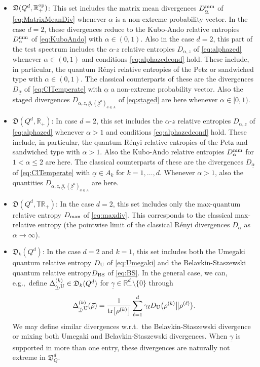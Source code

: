 \documentclass[12pt,a4paper,reqno]{amsart}
\theoremstyle{definition}
\newcommand{\mf}[1]{\mathfrak{#1}}
\newcommand{\R}{\mathbb R}
\newcommand{\T}{\mathbb T}
\newcommand{\tr}[1]{\mathrm{tr}\left[#1\right]} %
\let\originalleft\left
\let\originalright\right
\renewcommand{\left}{\mathopen{}\mathclose\bgroup\originalleft}
\renewcommand{\right}{\aftergroup\egroup\originalright}
\begin{document}
\begin{itemize}
\item $\mf D(Q^d,\R_+^{\rm op})$: This set includes the matrix mean divergences $D^{\rm mm}_{\underline{\alpha}}$ of \eqref{eq:MatrixMeanDiv} whenever $\underline{\alpha}$ is a non-extreme probability vector. In the case $d=2$, these divergences reduce to the Kubo-Ando relative entropies $D^{\rm mm}_\alpha$ of \eqref{eq:KuboAndo} with $\alpha\in(0,1)$. Also in the case $d=2$, this part of the test spectrum includes the $\alpha$-$z$ relative entropies $D_{\alpha,z}$ of \eqref{eq:alphazed} whenever $\alpha\in(0,1)$ and conditions \eqref{eq:alphazedcond} hold. These include, in particular, the quantum R\'{e}nyi relative entropies of the Petz or sandwiched type with $\alpha\in(0,1)$. The classical counterparts of these are the divergences $D_{\underline{\alpha}}$ of \eqref{eq:ClTemperate} with $\underline{\alpha}$ a non-extreme probability vector. Also the staged divergences $D_{\alpha,z,\underline{\beta},(\underline{\beta}^a)_{a\in A}}$ of \eqref{eq:staged} are here whenever $\alpha\in[0,1)$.
\item $\mf D(Q^d,\R_+)$: In case $d=2$, this set includes the $\alpha$-$z$ relative entropies $D_{\alpha,z}$ of \eqref{eq:alphazed} whenever $\alpha>1$ and conditions \eqref{eq:alphazedcond} hold. These include, in particular, the quantum R\'{e}nyi relative entropies of the Petz and sandwiched type with $\alpha>1$. Also the Kubo-Ando relative entropies $D_{\alpha}^{\rm mm}$ for $1<\alpha\leq 2$ are here. The classical counterparts of these are the divergences $D_{\underline{\alpha}}$ of \eqref{eq:ClTemperate} with $\underline{\alpha}\in A_k$ for $k=1,\ldots,d$. Whenever $\alpha>1$, also the quantities $D_{\alpha,z,\underline{\beta},(\underline{\beta}^a)_{a\in A}}$ are here.
\item $\mf D(Q^d,\T\R_+)$: In the case $d=2$, this set includes only the max-quantum relative entropy $D_{\rm max}$ of \eqref{eq:maxdiv}. This corresponds to the classical max-relative entropy (the pointwise limit of the classical R\'{e}nyi divergences $D_\alpha$ as $\alpha\to\infty$).
\item  $\mf D_k(Q^d)$: In the case $d=2$ and $k=1$, this set includes both the Umegaki quantum relative entropy $D_{\rm U}$ of \eqref{eq:Umegaki} and the Belavkin-Staszewski quantum relative entropy$D_{\rm BS}$ of \eqref{eq:BS}. In the general case, we can, e.g.,\ define $\Delta^{(k)}_{\underline{\gamma},{\rm U}}\in\mf D_k(Q^d)$ for $\underline{\gamma}\in\R_+^d\setminus\{0\}$ through
$$
\Delta^{(k)}_{\underline{\gamma},{\rm U}}(\vec{\rho})=\frac{1}{\tr{\rho^{(k)}}}\sum_{\ell=1}^d \gamma_\ell D_{\rm U}\big(\rho^{(k)}\big\|\rho^{(\ell)}\big).
$$
We may define similar divergences w.r.t.\ the Belavkin-Staszewski divergence or mixing both Umegaki and Belavkin-Staszewski divergences. When $\underline{\gamma}$ is supported in more than one entry, these divergences are naturally not extreme in $\mf D_Q^d$.
\end{itemize}
\end{document}
